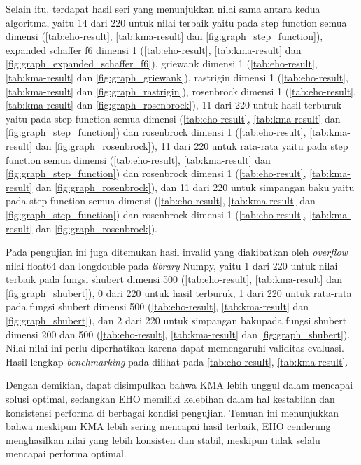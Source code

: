 Selain itu, terdapat hasil seri yang menunjukkan nilai sama antara kedua algoritma, yaitu 14 dari 220 untuk nilai terbaik yaitu pada step function semua dimensi (\cref{tab:eho-result}, \cref{tab:kma-result} dan \cref{fig:graph_step_function}), expanded schaffer f6 dimensi 1 (\cref{tab:eho-result}, \cref{tab:kma-result} dan \cref{fig:graph_expanded_schaffer_f6}), griewank dimensi 1 (\cref{tab:eho-result}, \cref{tab:kma-result} dan \cref{fig:graph_griewank}), rastrigin dimensi 1 (\cref{tab:eho-result}, \cref{tab:kma-result} dan \cref{fig:graph_rastrigin}), rosenbrock dimensi 1 (\cref{tab:eho-result}, \cref{tab:kma-result} dan \cref{fig:graph_rosenbrock}), 11 dari 220 untuk hasil terburuk yaitu pada step function semua dimensi (\cref{tab:eho-result}, \cref{tab:kma-result} dan \cref{fig:graph_step_function}) dan rosenbrock dimensi 1 (\cref{tab:eho-result}, \cref{tab:kma-result} dan \cref{fig:graph_rosenbrock}), 11 dari 220 untuk rata-rata  yaitu pada step function semua dimensi (\cref{tab:eho-result}, \cref{tab:kma-result} dan \cref{fig:graph_step_function}) dan rosenbrock dimensi 1 (\cref{tab:eho-result}, \cref{tab:kma-result} dan \cref{fig:graph_rosenbrock}), dan 11 dari 220 untuk simpangan baku yaitu pada step function semua dimensi (\cref{tab:eho-result}, \cref{tab:kma-result} dan \cref{fig:graph_step_function}) dan rosenbrock dimensi 1 (\cref{tab:eho-result}, \cref{tab:kma-result} dan \cref{fig:graph_rosenbrock}).

Pada pengujian ini juga ditemukan hasil invalid yang diakibatkan oleh \textit{overflow} nilai float64 dan longdouble pada \textit{library} Numpy, yaitu 1 dari 220 untuk nilai terbaik pada fungsi shubert dimensi 500 (\cref{tab:eho-result}, \cref{tab:kma-result} dan \cref{fig:graph_shubert}), 0 dari 220 untuk hasil terburuk, 1 dari 220 untuk rata-rata pada fungsi shubert dimensi 500 (\cref{tab:eho-result}, \cref{tab:kma-result} dan \cref{fig:graph_shubert}), dan 2 dari 220 untuk simpangan bakupada fungsi shubert dimensi 200 dan 500 (\cref{tab:eho-result}, \cref{tab:kma-result} dan \cref{fig:graph_shubert}). Nilai-nilai ini perlu diperhatikan karena dapat memengaruhi validitas evaluasi. Hasil lengkap \textit{benchmarking} pada dilihat pada \cref{tab:eho-result}, \cref{tab:kma-result}.

Dengan demikian, dapat disimpulkan bahwa KMA lebih unggul dalam mencapai solusi optimal, sedangkan EHO memiliki kelebihan dalam hal kestabilan dan konsistensi performa di berbagai kondisi pengujian. Temuan ini menunjukkan bahwa meskipun KMA lebih sering mencapai hasil terbaik, EHO cenderung menghasilkan nilai yang lebih konsisten dan stabil, meskipun tidak selalu mencapai performa optimal.


